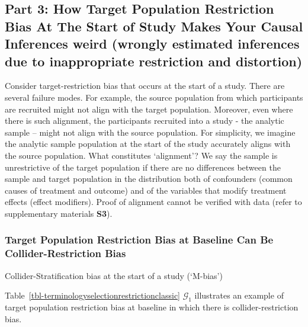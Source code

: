 \documentclass[
  single column]{article}
\begin{document}
\subsection{\texorpdfstring{Part 3: How Target Population Restriction
Bias At The Start of Study Makes Your Causal Inferences weird
(\textbf{w}rongly \textbf{e}stimated inferences due to
\textbf{i}nappropriate \textbf{r}estriction and
\textbf{d}istortion)}{Part 3: How Target Population Restriction Bias At The Start of Study Makes Your Causal Inferences weird (wrongly estimated inferences due to inappropriate restriction and distortion)}}\label{id-sec-3}

Consider target-restriction bias that occurs at the start of a study.
There are several failure modes. For example, the source population from
which participants are recruited might not align with the target
population. Moreover, even where there is such alignment, the
participants recruited into a study - the analytic sample -- might not
align with the source population. For simplicity, we imagine the
analytic sample population at the start of the study accurately aligns
with the source population. What constitutes `alignment'? We say the
sample is unrestrictive of the target population if there are no
differences between the sample and target population in the distribution
both of confounders (common causes of treatment and outcome) and of the
variables that modify treatment effects (effect modifiers). Proof of
alignment cannot be verified with data (refer to supplementary materials
\textbf{S3}).

\subsubsection{Target Population Restriction Bias at Baseline Can Be
Collider-Restriction
Bias}\label{target-population-restriction-bias-at-baseline-can-be-collider-restriction-bias}

\begin{table}

\caption{\label{tbl-terminologyselectionrestrictionclassic}Collider-Stratification
bias at the start of a study (`M-bias')}

\centering{

\terminologyselectionrestrictionclassic

}

\end{table}%

Table~\ref{tbl-terminologyselectionrestrictionclassic} \(\mathcal{G}_1\)
illustrates an example of target population restriction bias at baseline
in which there is collider-restriction bias.
\end{document}
